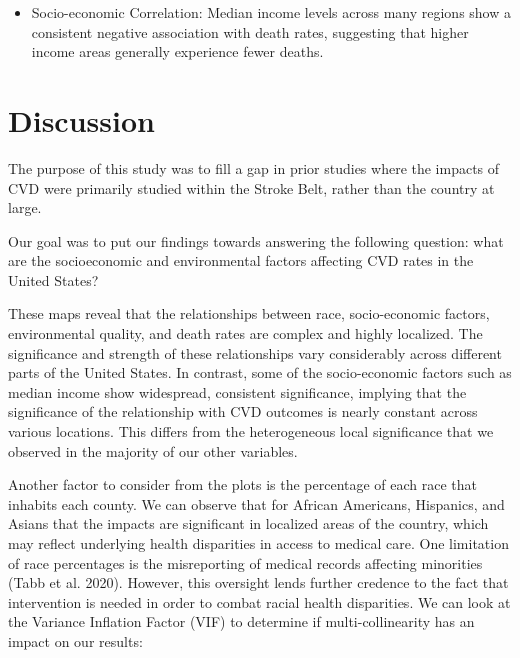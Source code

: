 \documentclass[
]{article}
\providecommand{\tightlist}{%
  \setlength{\itemsep}{0pt}\setlength{\parskip}{0pt}}\usepackage{longtable,booktabs,array}
\begin{document}
\begin{itemize}
\tightlist
\item
  Socio-economic Correlation: Median income levels across many regions
  show a consistent negative association with death rates, suggesting
  that higher income areas generally experience fewer deaths.
\end{itemize}

\section{Discussion}\label{discussion}

The purpose of this study was to fill a gap in prior studies where the
impacts of CVD were primarily studied within the Stroke Belt, rather
than the country at large.

Our goal was to put our findings towards answering the following
question: what are the socioeconomic and environmental factors affecting
CVD rates in the United States?

These maps reveal that the relationships between race, socio-economic
factors, environmental quality, and death rates are complex and highly
localized. The significance and strength of these relationships vary
considerably across different parts of the United States. In contrast,
some of the socio-economic factors such as median income show
widespread, consistent significance, implying that the significance of
the relationship with CVD outcomes is nearly constant across various
locations. This differs from the heterogeneous local significance that
we observed in the majority of our other variables.

Another factor to consider from the plots is the percentage of each race
that inhabits each county. We can observe that for African Americans,
Hispanics, and Asians that the impacts are significant in localized
areas of the country, which may reflect underlying health disparities in
access to medical care. One limitation of race percentages is the
misreporting of medical records affecting minorities (Tabb et al. 2020).
However, this oversight lends further credence to the fact that
intervention is needed in order to combat racial health disparities. We
can look at the Variance Inflation Factor (VIF) to determine if
multi-collinearity has an impact on our results:
\end{document}
